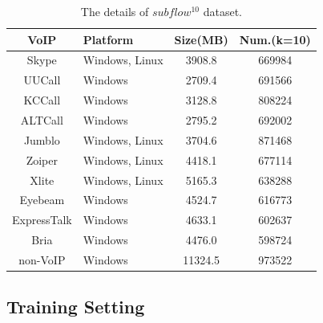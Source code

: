 \documentclass[conference]{IEEEtran}
\begin{document}
\begin{table}[htbp]
  \caption{The details of $subflow^{10}$ dataset.}
  \label{tab:traffic}
  \centering
  \begin{tabular}{c l c c}
    \hline
    \textbf{VoIP} & \textbf{Platform} & \textbf{Size(MB)}& \textbf{Num.(k=10)}\\
    \hline
    Skype      & Windows, Linux  & 3908.8  &  669984  \\
    UUCall      & Windows  & 2709.4  &  691566  \\
    KCCall      & Windows  & 3128.8  &  808224  \\
    ALTCall      & Windows  & 2795.2  &  692002  \\
    Jumblo      & Windows, Linux  & 3704.6  &  871468  \\
    Zoiper      & Windows, Linux  & 4418.1  &  677114  \\
    Xlite      & Windows, Linux  & 5165.3  &  638288  \\
    Eyebeam      & Windows  & 4524.7  &  616773  \\
    ExpressTalk      & Windows  & 4633.1  &  602637  \\
    Bria      & Windows  & 4476.0  &  598724  \\
    non-VoIP      & Windows  & 11324.5  &  973522  \\
    \hline
  \end{tabular}
\end{table}


\subsection{Training Setting}
\label{sec:trainingsetting}
\end{document}

